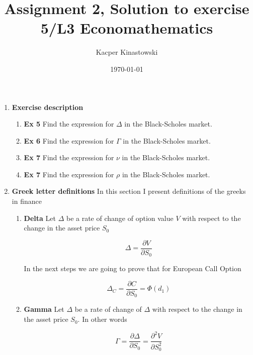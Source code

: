 \documentclass[12pt]{article}
\title{Assignment 2, Solution to exercise 5/L3 Economathematics}
\author{Kacper Kinastowski}
\date{\today}
\begin{document}
\maketitle
\begin{enumerate}[leftmargin=\labelsep]

\item \textbf{Exercise description} 

\begin{enumerate}
    \item \textbf{Ex 5} Find the expression for $\Delta$ in the Black-Scholes market.

    \item \textbf{Ex 6} Find the expression for $\Gamma$ in the Black-Scholes market.

    \item \textbf{Ex 7} Find the expression for $\nu$ in the Black-Scholes market.

    \item \textbf{Ex 7} Find the expression for $\rho$ in the Black-Scholes market.
\end{enumerate}

\item \textbf{Greek letter definitions} In this section I present definitions of the greeks in finance \cite{Yu2013OnDO}

\begin{enumerate}
    \item \textbf{Delta} Let $\Delta$ be a rate of change of option value $V$ with respect to the change in the asset price $S_0$

    \begin{equation}
        \Delta = \frac{\partial V}{\partial S_0}
    \end{equation}
    
    In the next steps we are going to prove that for European Call Option
    
    \begin{equation}
        \Delta_C = \frac{\partial C}{\partial S_0} = \Phi(d_1)
    \end{equation}

    \item \textbf{Gamma} Let $\Delta$ be a rate of change of $\Delta$ with respect to the change in the asset price $S_0$. In other words

    \begin{equation}
        \Gamma = \frac{\partial \Delta}{\partial S_0} 
        = \frac{\partial^2 V}{\partial S_0^2}
    \end{equation}


\end{enumerate}
\end{enumerate}
\end{document}

